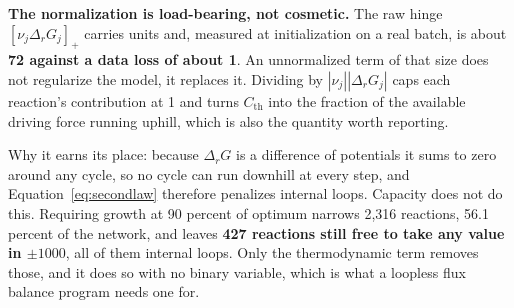 \textbf{The normalization is load-bearing, not cosmetic.} The raw hinge
$[\nu_j \Delta_r G_j]_+$ carries units and, measured at initialization on a real batch, is
about \textbf{72 against a data loss of about 1}. An unnormalized term of that size does not
regularize the model, it replaces it. Dividing by $|\nu_j||\Delta_r G_j|$ caps each
reaction's contribution at 1 and turns $C_{\mathrm{th}}$ into the fraction of the available
driving force running uphill, which is also the quantity worth reporting.

Why it earns its place: because $\Delta_r G$ is a difference of potentials it sums to zero
around any cycle, so no cycle can run downhill at every step, and
Equation~\eqref{eq:secondlaw} therefore penalizes internal loops. Capacity does not do this.
Requiring growth at 90 percent of optimum narrows 2{,}316 reactions, 56.1 percent of the
network, and leaves \textbf{427 reactions still free to take any value in $\pm1000$}, all of
them internal loops. Only the thermodynamic term removes those, and it does so with no
binary variable, which is what a loopless flux balance program needs one for.

